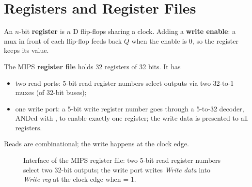 \section{Registers and Register Files}

An $n$-bit \textbf{register} is $n$ D flip-flops sharing a clock. Adding a
\textbf{write enable}: a mux in front of each flip-flop feeds back $Q$ when
the enable is 0, so the register keeps its value.

\begin{definition}
The MIPS \textbf{register file} holds 32 registers of 32 bits. It has
\begin{itemize}
  \item two read ports: 5-bit read register numbers select outputs via two
    32-to-1 muxes (of 32-bit buses);
  \item one write port: a 5-bit write register number goes through a
    5-to-32 decoder, ANDed with , to enable exactly one
    register; the write data is presented to all registers.
\end{itemize}
Reads are combinational; the write happens at the clock edge.
\end{definition}

\begin{figure}[H]
\centering
{}
\caption{Interface of the MIPS register file: two 5-bit read register
numbers select two 32-bit outputs; the write port writes \emph{Write data}
into \emph{Write reg} at the clock edge when  = 1.}
\end{figure}

